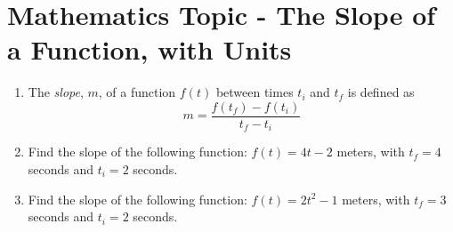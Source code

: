 \documentclass{article}
\begin{document}
\section{Mathematics Topic - The Slope of a Function, with Units}

\begin{enumerate}
\item The \textit{slope}, $m$, of a function $f(t)$ between times $t_i$ and $t_f$ is defined as 
\begin{equation}
m = \frac{f(t_f) - f(t_i)}{t_f - t_i}
\end{equation}
\item Find the slope of the following function: $f(t) = 4t - 2$ meters, with $t_f = 4$ seconds and $t_i = 2$ seconds. \vspace{1cm}
\item Find the slope of the following function: $f(t) = 2t^2 - 1$ meters, with $t_f = 3$ seconds and $t_i = 2$ seconds. \vspace{1cm}
\end{enumerate}
\end{document}
